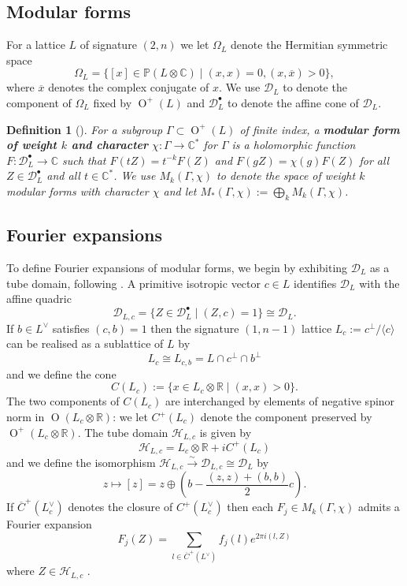 \documentclass[12pt, a4paper]{article}
\newtheorem{definition}[theorem]{Definition}
\newcommand{\RR}{\mathbb{R}}
\newcommand{\CC}{\mathbb{C}}
\newcommand{\PP}{\mathbb{P}}
\newcommand{\la}{\langle}
\newcommand{\ra}{\rangle}
\newcommand{\beq}{\begin{equation*}}
\newcommand{\eeq}{\end{equation*}}
\newcommand{\dc}{\mathcal{D}}
\newcommand{\hc}{\mathcal{H}}
\newcommand{\opn}{\operatorname}
\newcommand{\op}{\oplus}
\begin{document}
\subsection{Modular forms}
For a lattice $L$ of signature $(2,n)$ we let $\Omega_L$ denote the Hermitian symmetric space
\beq
\Omega_L = \{[x] \in \PP(L \otimes \CC) \mid (x,x)=0, (x, \overline{x}) > 0 \},
\eeq
where $\overline{x}$ denotes the complex conjugate of $x$.
We use $\dc_L$ to denote the component of $\Omega_L$ fixed by $\opn{O}^+(L)$ and $\dc_L^{\bullet}$ to denote the affine cone of $\dc_L$.
\begin{definition}[{\hspace{1sp}\cite{handbook}}]
  For a subgroup $\Gamma \subset \opn{O}^+(L)$ of finite index,    a \textbf{modular form of weight $k$ and character} $\chi:\Gamma \rightarrow \CC^*$ for $\Gamma$ is a holomorphic function $F: \dc_L^{\bullet} \rightarrow \CC$ such that
  $F(tZ) = t^{-k} F(Z)$ and
  $F(gZ) = \chi(g) F(Z)$
  for all $Z \in \dc_L^{\bullet}$ and all $t \in \CC^*$.
  We use $M_k(\Gamma, \chi)$ to denote the space of weight $k$ modular forms with character $\chi$ and let $M_*(\Gamma, \chi) := \bigoplus_k M_k(\Gamma, \chi)$.
\end{definition}
\subsection{Fourier expansions}
To define Fourier expansions of modular forms, we begin by exhibiting $\dc_L$ as a tube domain, following \cite{handbook}.
A primitive isotropic vector $c \in L$ identifies $\dc_L$ with the affine quadric
\beq
\dc_{L, c} = \{ Z \in \dc_L^{\bullet} \mid (Z, c) = 1 \} \cong \dc_L.
\eeq
If $b \in L^{\vee}$ satisfies $(c,b)=1$ then the signature $(1, n-1)$ lattice $L_c := c^{\perp}/\la c \ra$ can be realised as a sublattice of $L$ by 
\beq
L_c \cong L_{c,b} = L \cap c^{\perp} \cap b^{\perp} 
\eeq
and we define the cone 
\beq
C(L_c) := \{ x \in L_c \otimes \RR \mid (x,x)>0 \}.
\eeq
The two components of $C(L_c)$ are interchanged by elements of negative spinor norm in $\opn{O}(L_c \otimes \RR)$:  we let $C^+(L_c)$ denote the component preserved by $\opn{O}^+(L_c \otimes \RR)$.
The tube domain $\hc_{L,c}$ is given by  
\beq
\hc_{L,c} = L_c \otimes \RR + i C^+(L_c)
\eeq
and we define the isomorphism $\hc_{L,c} \xrightarrow{\sim} \dc_{L, c} \cong \dc_L$ by
\beq
z \mapsto [z] = z \op \left ( b - \frac{(z,z) + (b,b)}{2}c \right ).
\eeq
If $\overline{C}^+(L_c^{\vee})$ denotes the closure of  $C^+(L_c^{\vee})$ then each $F_j \in M_k(\Gamma, \chi)$ admits a Fourier expansion 
\beq
F_j(Z) = \sum_{l \in \overline{C}^+(L^{\vee})} f_j(l) e^{2 \pi i (l, Z)}
\eeq
where $Z \in \hc_{L, c}$ \cite{handbook}.
\end{document}
